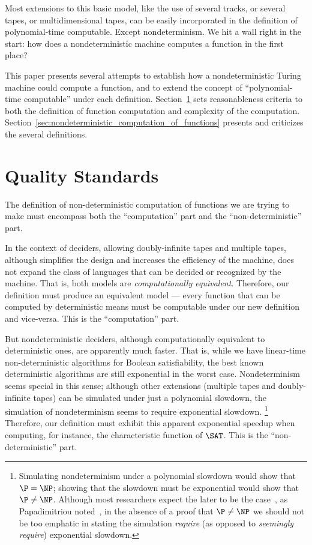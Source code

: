 \documentclass[12pt]{article}
\theoremstyle{definition}
\begin{document}
Most extensions to this basic model,
like the use of several tracks, or several tapes, or multidimensional tapes,
can be easily incorporated in the definition of polynomial-time computable.
Except nondeterminism.
We hit a wall right in the start:
how does a nondeterministic machine computes a function in the first place?

This paper presents several attempts to establish
how a nondeterministic Turing machine could compute a function,
and to extend the concept of ``polynomial-time computable'' under each definition.
Section~\ref{sec:quality-standards} sets reasonableness criteria
to both the definition of function computation and complexity of the computation.
Section~\ref{sec:nondeterministic_computation_of_functions}
presents and criticizes the several definitions.

\section{Quality Standards}
\label{sec:quality-standards}

The definition of non-deterministic computation of functions we are trying to make
must encompass both the ``computation'' part
and the ``non-deterministic'' part.

In the context of deciders,
allowing doubly-infinite tapes and multiple tapes,
although simplifies the design and increases the efficiency of the machine,
does not expand the class of languages that can be decided or recognized by the machine.
That is, both models are \emph{computationally equivalent}.
Therefore,
our definition must produce an equivalent model
--- every function that can be computed by deterministic means
must be computable under our new definition and vice-versa.
This is the ``computation'' part.

But nondeterministic deciders,
although computationally equivalent to deterministic ones,
are apparently much faster.
That is, while we have linear-time non-deterministic algorithms for Boolean satisfiability,
the best known deterministic algorithms are still exponential in the worst case.
Nondeterminism seems special in this sense;
although other extensions (multiple tapes and doubly-infinite tapes)
can be simulated under just a polynomial slowdown,
the simulation of nondeterminism seems to require exponential slowdown.%
\footnote{
    Simulating nondeterminism under a polynomial slowdown would show that $\P = \NP$;
    showing that the slowdown must be exponential would show that $\P \neq \NP$.
    Although most researchers expect the later to be the case~\cite[p.~54]{Gasarch2012},
    as Papadimitriou noted~\cite[p.~412]{Papadimitriou1994},
    in the absence of a proof that $\P \neq \NP$
    we should not be too emphatic in stating the simulation \emph{require}
    (as opposed to \emph{seemingly require}) exponential slowdown.
}
Therefore,
our definition must exhibit this apparent exponential speedup
when computing, for instance, the characteristic function of $\SAT$.
This is the ``non-deterministic'' part.
\end{document}
